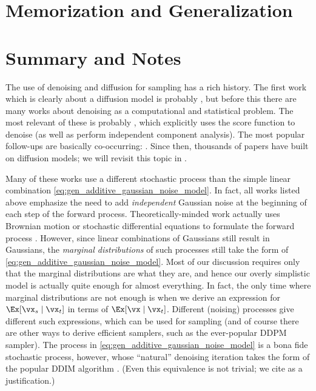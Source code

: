 \documentclass[../../book-main.tex]{subfiles}
\begin{document}
\section{Memorization and Generalization}



\section{Summary and Notes}

The use of denoising and diffusion for sampling has a rich history. The first work which is clearly about a diffusion model is probably \cite{Sohl-Dickstein2015}, but before this there are many works about denoising as a computational and statistical problem. The most relevant of these is probably \cite{hyvarinen05a}, which explicitly uses the score function to denoise (as well as perform independent component analysis). The most popular follow-ups are basically co-occurring: \cite{ho2020denoising,song2019}. Since then, thousands of papers have built on diffusion models; we will revisit this topic in .

Many of these works use a different stochastic process than the simple linear combination \eqref{eq:gen_additive_gaussian_noise_model}. In fact, all works listed above emphasize the need to add \textit{independent} Gaussian noise at the beginning of each step of the forward process. Theoretically-minded work actually uses Brownian motion or stochastic differential equations to formulate the forward process \cite{song2020score}. However, since linear combinations of Gaussians still result in Gaussians, the \textit{marginal distributions} of such processes still take the form of \eqref{eq:gen_additive_gaussian_noise_model}. Most of our discussion requires only that the marginal distributions are what they are, and hence our overly simplistic model is actually quite enough for almost everything. In fact, the only time where marginal distributions are not enough is when we derive an expression for \(\Ex[\vx_{s} \mid \vx_{t}]\) in terms of \(\Ex[\vx \mid \vx_{t}]\). Different (noising) processes give different such expressions, which can be used for sampling (and of course there are other ways to derive efficient samplers, such as the ever-popular DDPM sampler). The process in \eqref{eq:gen_additive_gaussian_noise_model} is a bona fide stochastic process, however, whose ``natural'' denoising iteration takes the form of the popular DDIM algorithm \cite{song2020denoising}. (Even this equivalence is not trivial; we cite \cite{de2025distributional} as a justification.) 
\end{document}
